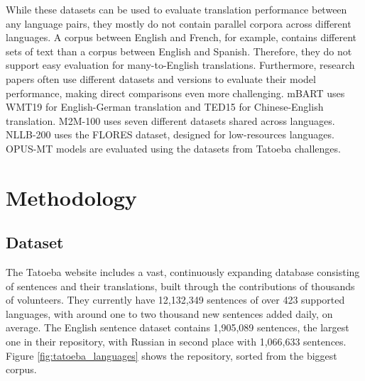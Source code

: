 \documentclass[a4paper, 11pt]{article}
\begin{document}
While these datasets can be used to evaluate translation performance between any language pairs, they mostly do not contain parallel corpora across different languages. A corpus between English and French, for example, contains different sets of text than a corpus between English and Spanish. Therefore, they do not support easy evaluation for many-to-English translations. Furthermore, research papers often use different datasets and versions to evaluate their model performance, making direct comparisons even more challenging. mBART \cite{liu-2020-mbart} uses WMT19 for English-German translation and TED15 for Chinese-English translation. M2M-100 \cite{fan-2020-m2m100} uses seven different datasets shared across languages. NLLB-200  \cite{nllb200-2020} uses the FLORES dataset, designed for low-resources languages. OPUS-MT \cite{tiedemann-2023-democratizing,tiedemann-2020-opus-mt} models are evaluated using the datasets from Tatoeba challenges.


\section{Methodology}

\subsection{Dataset}

The Tatoeba website \cite{tatoeba} includes a vast, continuously expanding database consisting of sentences and their translations, built through the contributions of thousands of volunteers. They currently have 12,132,349 sentences of over 423 supported languages, with around one to two thousand new sentences added daily, on average. The English sentence dataset contains 1,905,089 sentences, the largest one in their repository, with Russian in second place with 1,066,633 sentences. Figure \ref{fig:tatoeba_languages} shows the repository, sorted from the biggest corpus.
\end{document}
